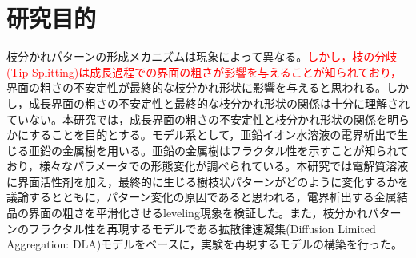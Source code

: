 \documentclass[autodetect-engine,dvi=dvipdfmx,a4paper,ja=standard,oneside,openany,11pt,draft]{bxjsbook}
\begin{document}
\section{研究目的}
枝分かれパターンの形成メカニズムは現象によって異なる。\textcolor{red}{しかし，枝の分岐(Tip Splitting)は成長過程での界面の粗さが影響を与える\cite{}ことが知られており，}界面の粗さの不安定性が最終的な枝分かれ形状に影響を与えると思われる。しかし，成長界面の粗さの不安定性と最終的な枝分かれ形状の関係は十分に理解されていない。本研究では，成長界面の粗さの不安定性と枝分かれ形状の関係を明らかにすることを目的とする。モデル系として，亜鉛イオン水溶液の電界析出で生じる亜鉛の金属樹を用いる。亜鉛の金属樹はフラクタル性を示すことが知られており\cite{matsushita1984fractal}，様々なパラメータでの形態変化が調べられている\cite{suda2003temperature}。本研究では電解質溶液に界面活性剤を加え，最終的に生じる樹枝状パターンがどのように変化するかを議論するとともに，パターン変化の原因であると思われる，電界析出する金属結晶の界面の粗さを平滑化させるleveling現象を検証した。また，枝分かれパターンのフラクタル性を再現するモデルである拡散律速凝集(Diffusion Limited Aggregation: DLA)モデル\cite{witten1981diffusion}をベースに，実験を再現するモデルの構築を行った。

\ifdraft{
  
  
}{}
% 
% 
\end{document}
